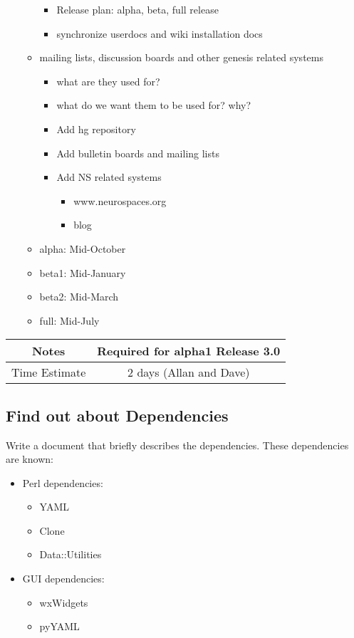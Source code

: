 \documentclass[12pt]{article}
\begin{document}
\begin{itemize}
\begin{itemize}
\begin{itemize}
    \item Release plan: alpha, beta, full release
    \item synchronize userdocs and wiki installation docs
    \end{itemize}
  \item mailing lists, discussion boards and other genesis related systems
    \begin{itemize}
    \item what are they used for?
    \item what do we want them to be used for? why?
    \item Add hg repository
    \item Add bulletin boards and mailing lists
    \item Add NS related systems
      \begin{itemize}
      \item www.neurospaces.org
      \item blog
      \end{itemize}
    \end{itemize}
  \item alpha: Mid-October
  \item beta1: Mid-January
  \item beta2: Mid-March
  \item full: Mid-July
  \end{itemize}
\end{itemize}

{
  \vspace{5mm}
  \centering
  \begin{tabular}{|c|c|}
    \hline
    Notes
    & Required for alpha1 Release 3.0 \\
    \hline
    Time Estimate
    & 2 days (Allan and Dave) \\
    \hline
  \end{tabular}
}


\subsection{Find out about Dependencies}

Write a document that briefly describes the dependencies.  These
dependencies are known:
\begin{itemize}
\item Perl dependencies:
  \begin{itemize}
  \item YAML
  \item Clone
  \item Data::Utilities
  \end{itemize}
\item GUI dependencies:
  \begin{itemize}
  \item wxWidgets
  \item pyYAML
  \end{itemize}
\end{itemize}
\end{document}
